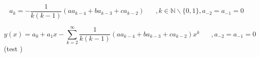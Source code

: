 \begin{refsection}
\begin{equation}
	a_{k} = -\frac{1}{k(k-1)} (aa_{k-4}+ba_{k-3}+ca_{k-2})
	\hspace{20pt}, k \in \mathbb{N} \backslash \{0, 1\}, a_{-2} = a_{-1} = 0
	\label{wellen:koeffizientengleichungak}
\end{equation}

\begin{equation}
	y(x) = a_0 + a_1x 
	-\sum_{k=2}^{\infty}\frac{1}{k(k-1)}(aa_{k-4}+ba_{k-3}+ca_{k-2})x^k
	\hspace{20pt}, a_{-2} = a_{-1} = 0
	\label{wellen:ygleichungak}
\end{equation}
(test \cite{wellen:smirnow2})

\printbibliography[heading=subbibliography]
\end{refsection}